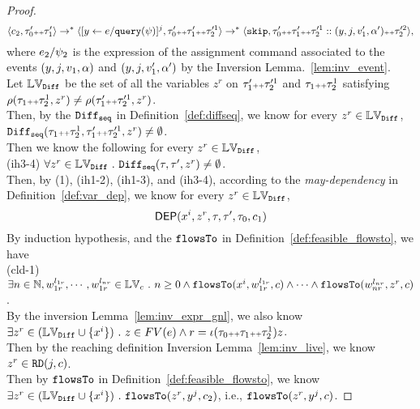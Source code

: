 \begin{proof}
\begin{equation}
\langle c_2, \mathtt{\tau}_0' {\scriptscriptstyle ++} \mathtt{\tau}_1' \rangle \rightarrow^{*} 
\langle [\mathrel{ y \leftarrow e / {\tt query}(\psi) }]{}^{j}, \mathtt{\tau}_0' {\scriptscriptstyle ++} \mathtt{\tau}_1' {\scriptscriptstyle ++} \mathtt{\tau}'^1_2 \rangle 
\rightarrow^* \langle \mathtt{skip}, \mathtt{\tau}_0' {\scriptscriptstyle ++} \mathtt{\tau}_1' {\scriptscriptstyle ++} \mathtt{\tau}'^1_2 ::(y, j, v_1', \alpha') {\scriptscriptstyle ++} \mathtt{\tau}'^2_2 \rangle,
\end{equation}
where $e_2 / \psi_2$ is the expression of the assignment command associated to the events $(y, j, v_1, \alpha)$ and $(y, j, v_1', \alpha')$ by the Inversion Lemma.~\ref{lem:inv_event}.
\\
Let $\mathbb{LV}_{\mathtt{Diff}}$ be the set of all the variables $z^r$ on $\mathtt{\tau}_1' {\scriptscriptstyle ++} \mathtt{\tau}'^1_2$ and $\mathtt{\tau}_1 {\scriptscriptstyle ++} \mathtt{\tau}_2^1$ 
satisfying $\rho(\mathtt{\tau}_1 {\scriptscriptstyle ++} \mathtt{\tau}_2^1, z^r) \neq \rho(\mathtt{\tau}_1'{\scriptscriptstyle ++} \mathtt{\tau}'^1_2, z^r) $.
\\
Then, by the $\mathtt{Diff}_{\mathtt{seq}}$ in Definition~\ref{def:diffseq}, we know for every $z^r \in \mathbb{LV}_{\mathtt{Diff}}$,
$\mathtt{Diff}_{\mathtt{seq}}(\mathtt{\tau}_1 {\scriptscriptstyle ++} \mathtt{\tau}_2^1, \mathtt{\tau}_1'{\scriptscriptstyle ++} \mathtt{\tau}'^1_2, z^r) \neq \emptyset$. 
\\
Then we know the following for every $z^r \in \mathbb{LV}_{\mathtt{Diff}}$,
\\
(ih3-4) $\forall z^r \in \mathbb{LV}_{\mathtt{Diff}} ~.~   \mathtt{Diff}_{\mathtt{seq}}(\mathtt{\tau}, \mathtt{\tau}', z^r) \neq \emptyset$.
\\
Then, by (1), (ih1-2), (ih1-3), and (ih3-4),  according to the \emph{may-dependency} in Definition~\ref{def:var_dep}, we know for every $z^r \in \mathbb{LV}_{\mathtt{Diff}}$,
\[
  \mathsf{DEP}(x^i, z^r, \mathtt{\tau}, \mathtt{\tau}', \mathtt{\tau}_0, c_1)
\]
By induction hypothesis, and the $\mathtt{flowsTo}$ in Definition~\ref{def:feasible_flowsto}, we have 
\\
(cld-1) 
$\exists n \in \mathbb{N}, w_{1r}^{l_{1r}}, \cdots, w_{1r}^{l_{nr}} \in \mathbb{LV}_{{c}} ~.~   n \geq 0 \land
\mathtt{flowsTo}(x^i,  w_{1r}^{l_{1r}}, c) 
\land \cdots \land \mathtt{flowsTo}(w_{nr}^{l_{nr}}, z^r, c)$.
\\
By the inversion Lemma~\ref{lem:inv_expr_gnl}, we also know 
$\exists z^r \in (\mathbb{LV}_{\mathtt{Diff}} \cup \{x^i\} ) ~.~   z \in FV(e) 
\land r = \iota(\mathtt{\tau}_0 {\scriptscriptstyle ++} \mathtt{\tau}_1 {\scriptscriptstyle ++} \mathtt{\tau}_2^1) z$.
\\
Then by the reaching definition Inversion Lemma~\ref{lem:inv_live}, we know $z^r \in \mathtt{RD}(j, c)$.
\\
Then by $\mathtt{flowsTo}$ in Definition~\ref{def:feasible_flowsto}, 
we know 
$ \exists z^r \in (\mathbb{LV}_{\mathtt{Diff}} \cup \{x^i\} ) ~.~   \mathtt{flowsTo}(z^r, y^j, c_2)$, i.e., $\mathtt{flowsTo}(z^r, y^j, c)$.

\end{proof}
